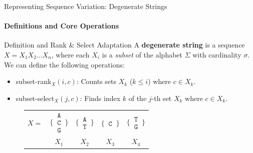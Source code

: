 \begin{frame}{Representing Sequence Variation: Degenerate Strings}
    \framesubtitle{Definitions and Core Operations}
    \begin{block}{Definition and Rank \& Select Adaptation}
        A \textbf{degenerate string} is a sequence $X = X_1 X_2 \dots X_n$, where each $X_i$ is a \emph{subset} of the alphabet $\Sigma$ with cardinality $\sigma$. We can define the following operations:
        \begin{itemize}
            \item \textsf{subset-rank}$_X(i, c)$: Counts sets $X_k$ ($k \le i$) where $c \in X_k$.
            \item \textsf{subset-select}$_X(j, c)$: Finds index $k$ of the $j$-th set $X_k$ where $c \in X_k$.
        \end{itemize}
    \end{block}
    \begin{figure}[h!] %
        \centering
        \begin{tabular}{c@{\hskip 0.5em}c@{\hskip 0.5em}c@{\hskip 0.5em}c@{\hskip 0.5em}c}
            $X = $                                                               & $\Bigg\{\,\begin{matrix}\texttt{A}\\\texttt{C}\\\texttt{G}\end{matrix}\,\Bigg\}$ &
            $\Bigg\{\,\begin{matrix}\texttt{A}\\\texttt{T}\end{matrix}\,\Bigg\}$ &
            $\Bigg\{\,\begin{matrix}\texttt{C}\end{matrix}\,\Bigg\}$             &
            $\Bigg\{\,\begin{matrix}\texttt{T}\\\texttt{G}\end{matrix}\,\Bigg\}$                                                                                                            \\
                                                                                 & $X_1$                                                                            & $X_2$ & $X_3$ & $X_4$
        \end{tabular}
\end{figure}
\end{frame}
